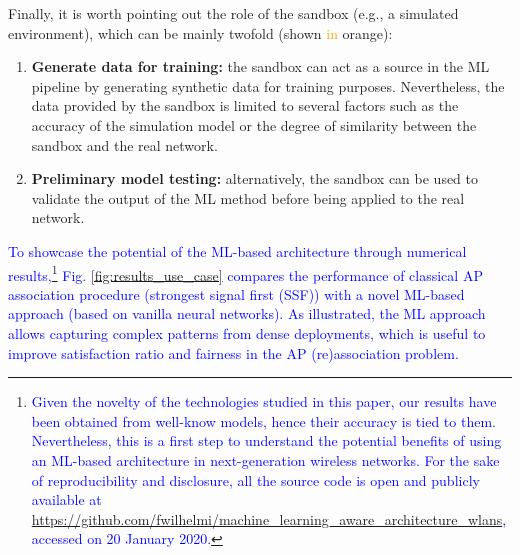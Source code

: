 \documentclass[journal]{IEEEtran}
\begin{document}
Finally, it is worth pointing out the role of the sandbox (e.g., a simulated environment), which can be mainly twofold (shown \textcolor{orange}{in} orange):
\begin{enumerate}
	\item \textbf{Generate data for training:} the sandbox can act as a source in the ML pipeline by generating synthetic data for training purposes. Nevertheless, the data provided by the sandbox is limited to several factors such as the accuracy of the simulation model or the degree of similarity between the sandbox and the real network. %
	\item \textbf{Preliminary model testing:} alternatively, the sandbox can be used to validate the output of the ML method before being applied to the real network.
\end{enumerate}

\textcolor{blue}{To showcase the potential of the ML-based architecture through numerical results,\footnote{\textcolor{blue}{Given the novelty of the technologies studied in this paper, our results have been obtained from well-know models, hence their accuracy is tied to them. Nevertheless, this is a first step to understand the potential benefits of using an ML-based architecture in next-generation wireless networks. For the sake of reproducibility and disclosure, all the source code is open and publicly available at \url{https://github.com/fwilhelmi/machine_learning_aware_architecture_wlans}, accessed on 20 January 2020.}} Fig. \ref{fig:results_use_case} compares the performance of classical AP association procedure (strongest signal first (SSF)) with a novel ML-based approach (based on vanilla neural networks). As illustrated, the ML approach allows capturing complex patterns from dense deployments, which is useful to improve satisfaction ratio and fairness in the AP (re)association problem.}
\end{document}
